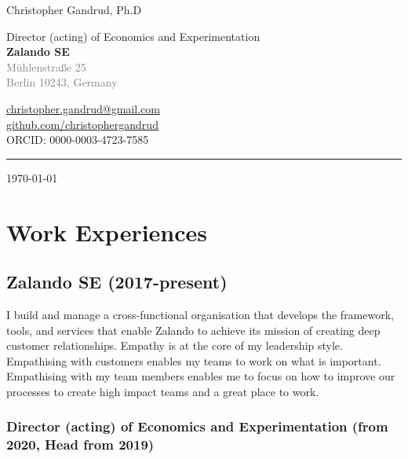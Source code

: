 \documentclass[a4paper]{article}
\begin{document}
    \begin{flushright}
        {\huge{Christopher Gandrud, Ph.D}} \\
        \vspace{0.251cm}

        Director (acting) of Economics and Experimentation \\
        {\bf{\large{Zalando SE}}} \\
        \textcolor{gray}{M\"{u}hlenstra{\ss}e 25\\
        Berlin 10243, Germany} \\
        \vspace{0.25cm}

        \href{mailto:christopher.gandrud@gmail.com}{christopher.gandrud@gmail.com}\\
        \href{https://github.com/christophergandrud}{github.com/christophergandrud}\\[0.25cm]

        ORCID: 0000-0003-4723-7585\\[0.25cm]

        \medskip\hrule height 1pt

        \vspace{0.5cm}

        \today

    \end{flushright}



\vspace{0.5cm}

\section*{Work Experiences}

\subsection*{Zalando SE (2017-present)}

I build and manage a cross-functional organisation that develops the framework, tools, and services that enable Zalando to achieve its mission of creating deep customer relationships. Empathy is at the core of my leadership style. Empathising with customers enables my teams to work on what is important. Empathising with my team members enables me to focus on how to improve our processes to create high impact teams and a great place to work.

\subsubsection*{Director (acting) of Economics and Experimentation (from 2020, Head from 2019)}
\end{document}
